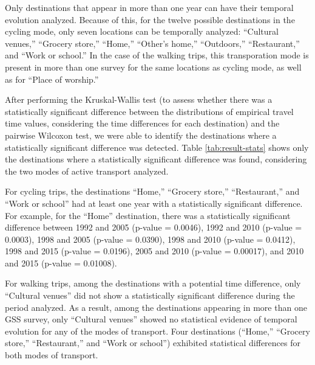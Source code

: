 \documentclass[preprint, 3p,
authoryear]{elsarticle} %
\begin{document}
Only destinations that appear in more than one year can have their
temporal evolution analyzed. Because of this, for the twelve possible
destinations in the cycling mode, only seven locations can be temporally
analyzed: ``Cultural venues,'' ``Grocery store,'' ``Home,'' ``Other's
home,'' ``Outdoors,'' ``Restaurant,'' and ``Work or school.'' In the
case of the walking trips, this transporation mode is present in more
than one survey for the same locations as cycling mode, as well as for
``Place of worship.''

After performing the Kruskal-Wallis test (to assess whether there was a
statistically significant difference between the distributions of
empirical travel time values, considering the time differences for each
destination) and the pairwise Wilcoxon test, we were able to identify
the destinations where a statistically significant difference was
detected. Table \ref{tab:result-stats} shows only the destinations where
a statistically significant difference was found, considering the two
modes of active transport analyzed.

For cycling trips, the destinations ``Home,'' ``Grocery store,''
``Restaurant,'' and ``Work or school'' had at least one year with a
statistically significant difference. For example, for the ``Home''
destination, there was a statistically significant difference between
1992 and 2005 (p-value = 0.0046), 1992 and 2010 (p-value = 0.0003), 1998
and 2005 (p-value = 0.0390), 1998 and 2010 (p-value = 0.0412), 1998 and
2015 (p-value = 0.0196), 2005 and 2010 (p-value = 0.00017), and 2010 and
2015 (p-value = 0.01008).

For walking trips, among the destinations with a potential time
difference, only ``Cultural venues'' did not show a statistically
significant difference during the period analyzed. As a result, among
the destinations appearing in more than one GSS survey, only ``Cultural
venues'' showed no statistical evidence of temporal evolution for any of
the modes of transport. Four destinations (``Home,'' ``Grocery store,''
``Restaurant,'' and ``Work or school'') exhibited statistical
differences for both modes of transport.
\end{document}
